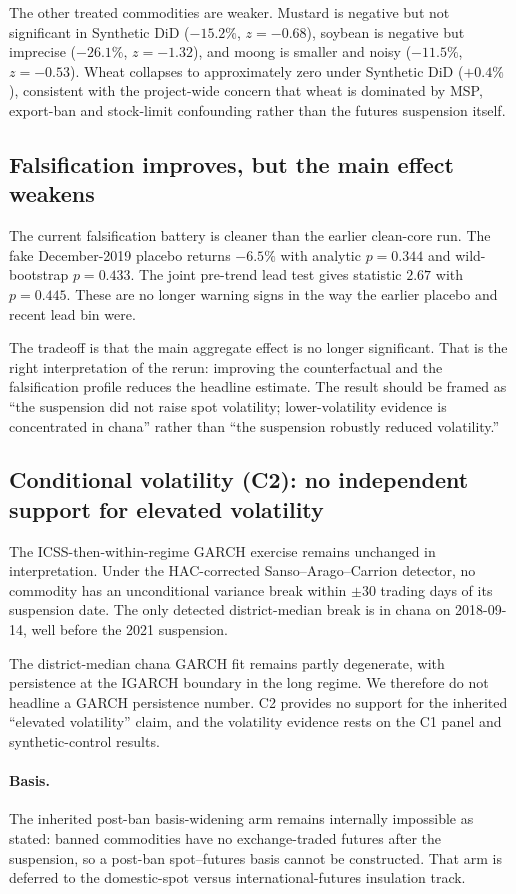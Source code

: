 The other treated commodities are weaker. Mustard is negative but not significant in
Synthetic DiD ($-15.2\%$, $z=-0.68$), soybean is negative but imprecise ($-26.1\%$,
$z=-1.32$), and moong is smaller and noisy ($-11.5\%$, $z=-0.53$). Wheat collapses to
approximately zero under Synthetic DiD ($+0.4\%$), consistent with the project-wide
concern that wheat is dominated by MSP, export-ban and stock-limit confounding rather
than the futures suspension itself.

\subsection{Falsification improves, but the main effect weakens}
\label{sec:results-falsification}

The current falsification battery is cleaner than the earlier clean-core run. The fake
December-2019 placebo returns $-6.5\%$ with analytic $p=0.344$ and wild-bootstrap
$p=0.433$. The joint pre-trend lead test gives statistic $2.67$ with $p=0.445$. These
are no longer warning signs in the way the earlier placebo and recent lead bin were.

The tradeoff is that the main aggregate effect is no longer significant. That is the
right interpretation of the rerun: improving the counterfactual and the falsification
profile reduces the headline estimate. The result should be framed as ``the suspension
did not raise spot volatility; lower-volatility evidence is concentrated in chana''
rather than ``the suspension robustly reduced volatility.''

\subsection{Conditional volatility (C2): no independent support for elevated volatility}
\label{sec:results-c2}

The ICSS-then-within-regime GARCH exercise remains unchanged in interpretation. Under
the HAC-corrected Sanso--Arago--Carrion detector, no commodity has an unconditional
variance break within $\pm 30$ trading days of its suspension date. The only detected
district-median break is in chana on 2018-09-14, well before the 2021 suspension.

The district-median chana GARCH fit remains partly degenerate, with persistence at the
IGARCH boundary in the long regime. We therefore do not headline a GARCH persistence
number. C2 provides no support for the inherited ``elevated volatility'' claim, and the
volatility evidence rests on the C1 panel and synthetic-control results.

\paragraph{Basis.}
The inherited post-ban basis-widening arm remains internally impossible as stated:
banned commodities have no exchange-traded futures after the suspension, so a post-ban
spot--futures basis cannot be constructed. That arm is deferred to the domestic-spot
versus international-futures insulation track.
